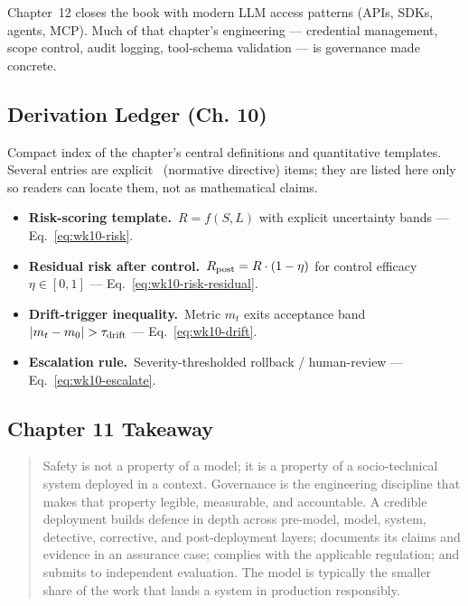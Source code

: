 Chapter~12 closes the book with modern LLM access patterns (APIs,
SDKs, agents, MCP). Much of that chapter's engineering ---
credential management, scope control, audit logging,
tool-schema validation --- is governance made concrete.

\subsection*{Derivation Ledger (Ch. 10)}

\begin{derivledger}
Compact index of the chapter's central definitions and quantitative
templates. Several entries are explicit \Norm\ (normative directive)
items; they are listed here only so readers can locate them, not as
mathematical claims.
\begin{itemize}
  \item \textbf{Risk-scoring template.}\
        $R = f(S, L)$ with explicit uncertainty bands
        --- Eq.~\eqref{eq:wk10-risk}.
  \item \textbf{Residual risk after control.}\
        $R_{\rm post} = R \cdot (1 - \eta)$ for control efficacy
        $\eta \in [0, 1]$ --- Eq.~\eqref{eq:wk10-risk-residual}.
  \item \textbf{Drift-trigger inequality.}\
        Metric $m_t$ exits acceptance band
        $|m_t - m_0| > \tau_{\rm drift}$
        --- Eq.~\eqref{eq:wk10-drift}.
  \item \textbf{Escalation rule.}\
        Severity-thresholded rollback / human-review
        --- Eq.~\eqref{eq:wk10-escalate}.
\end{itemize}
\end{derivledger}

\subsection{Chapter 11 Takeaway}

\begin{quote}
Safety is not a property of a model; it is a property of a
socio-technical system deployed in a context. Governance is the
engineering discipline that makes that property legible,
measurable, and accountable. A credible deployment builds
defence in depth across pre-model, model, system, detective,
corrective, and post-deployment layers; documents its claims
and evidence in an assurance case; complies with the applicable
regulation; and submits to independent evaluation. The model is
typically the smaller share of the work that lands a system in
production responsibly.
\end{quote}
